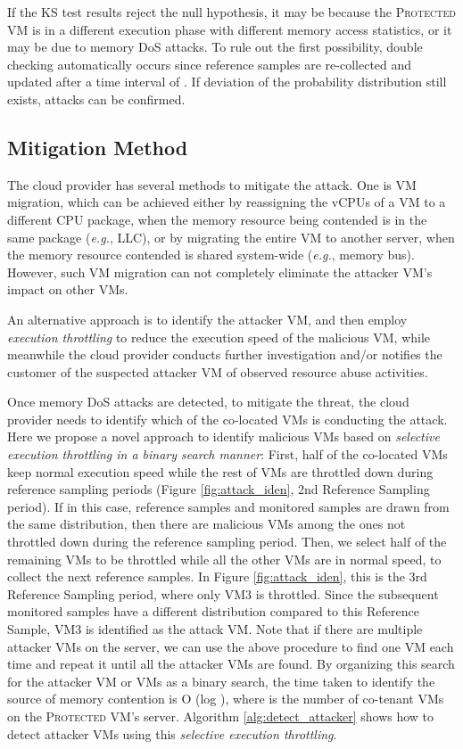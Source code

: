 \documentclass{sig-alternate}
\newcommand{\bheading}[1]{{\vspace{2pt}\noindent{\textbf{#1}}\hspace{2pt}}}
\newcommand{\eg}{\emph{e.g.}\xspace}
\newcommand{\attackname}{memory DoS attacks\xspace}
\newcommand{\protectedVM}{\textsc{Protected VM}\xspace}
\begin{document}
If the KS test results reject the null hypothesis, it may be because the 
\protectedVM is in a different execution phase with different memory access 
statistics, or it may be due to \attackname. To rule out the first possibility, 
double checking automatically occurs since reference samples are re-collected and 
updated after a time interval of . If deviation of the probability 
distribution still exists, attacks can be confirmed.

\subsection{Mitigation Method}
\label{sec:mitigation}

The cloud provider has several methods to mitigate the attack. One is VM 
migration, which can be achieved either by reassigning the vCPUs of a VM to a
different CPU package, when the memory resource being contended is in the same
package (\eg, LLC), or by migrating the entire VM to another server, when the 
memory resource contended is shared system-wide (\eg, memory bus). However, such 
VM migration can not completely eliminate the attacker VM's impact on other VMs.
 
An alternative approach is to identify the attacker VM, and then employ 
\emph{execution throttling} to reduce the execution speed of the malicious VM, 
while meanwhile the cloud provider conducts further investigation and/or notifies 
the customer of the suspected attacker VM of observed resource abuse activities. 


\bheading{Identifying the attacker VM.} 
Once \attackname are detected, to mitigate the threat, the cloud provider needs
to identify which of the co-located VMs is conducting the attack. Here we propose 
a novel approach to identify malicious VMs based on \textit{selective execution 
throttling in a binary search manner}: First, half of the co-located VMs keep 
normal execution speed while the rest of VMs are throttled down during reference 
sampling periods (Figure \ref{fig:attack_iden}, 2nd Reference Sampling period). If in this case, reference samples and monitored samples are drawn 
from the same distribution, then there are malicious VMs among the ones not 
throttled down during the reference sampling period. Then, we select half of the 
remaining VMs to be throttled while all the other VMs are in normal speed, to
collect the next reference samples. In Figure \ref{fig:attack_iden}, this is the 3rd Reference 
Sampling period, where only VM3 is throttled. Since the subsequent monitored 
samples have a different distribution compared to this Reference Sample, VM3 is 
identified as the attack VM. Note that if there are multiple attacker VMs on the 
server, we can use the above procedure to find one VM each time and repeat it 
until all the attacker VMs are found. By organizing this search for the attacker 
VM or VMs as a binary search, the time taken to identify the source of memory 
contention is O (log ), where  is the number of co-tenant VMs on the 
\protectedVM's server. Algorithm \ref{alg:detect_attacker} shows how to detect 
attacker VMs using this \emph{selective execution throttling}. 
\end{document}
